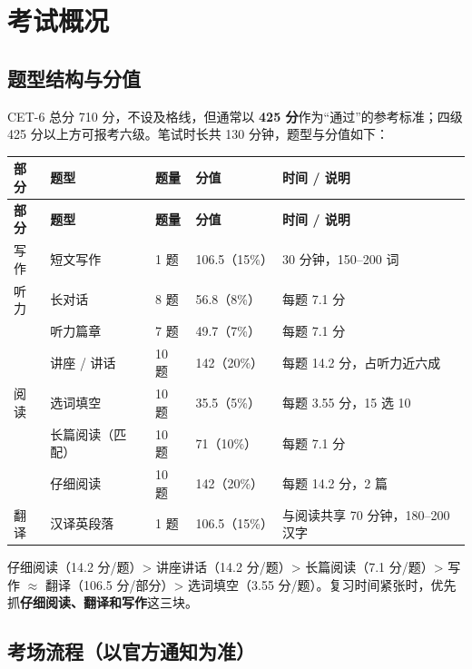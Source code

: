 \section{考试概况}

\subsection{题型结构与分值}

CET-6 总分 710 分，不设及格线，但通常以 \textbf{425 分}作为“通过”的参考标准；四级 425 分以上方可报考六级。笔试时长共 130 分钟，题型与分值如下：

\begin{center}
\small
\begin{longtable}{p{2.6cm}p{3.4cm}p{1.6cm}p{1.9cm}p{4.6cm}}
\toprule
\textbf{部分} & \textbf{题型} & \textbf{题量} & \textbf{分值} & \textbf{时间 / 说明} \\
\midrule
\endfirsthead
\toprule
\textbf{部分} & \textbf{题型} & \textbf{题量} & \textbf{分值} & \textbf{时间 / 说明} \\
\midrule
\endhead
写作 & 短文写作 & 1 题 & 106.5（15\%） & 30 分钟，150--200 词 \\
\midrule
听力 & 长对话 & 8 题 & 56.8（8\%） & 每题 7.1 分 \\
 & 听力篇章 & 7 题 & 49.7（7\%） & 每题 7.1 分 \\
 & 讲座 / 讲话 & 10 题 & 142（20\%） & 每题 14.2 分，占听力近六成 \\
\midrule
阅读 & 选词填空 & 10 题 & 35.5（5\%） & 每题 3.55 分，15 选 10 \\
 & 长篇阅读（匹配） & 10 题 & 71（10\%） & 每题 7.1 分 \\
 & 仔细阅读 & 10 题 & 142（20\%） & 每题 14.2 分，2 篇 \\
\midrule
翻译 & 汉译英段落 & 1 题 & 106.5（15\%） & 与阅读共享 70 分钟，180--200 汉字 \\
\bottomrule
\end{longtable}
\end{center}

\begin{tipbox}
仔细阅读（14.2 分/题）> 讲座讲话（14.2 分/题）> 长篇阅读（7.1 分/题）> 写作 $\approx$ 翻译（106.5 分/部分）> 选词填空（3.55 分/题）。复习时间紧张时，优先抓\textbf{仔细阅读、翻译和写作}这三块。
\end{tipbox}

\subsection{考场流程（以官方通知为准）}


